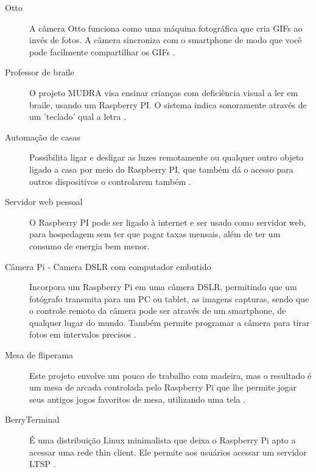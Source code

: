 \documentclass[
	12pt,				%
	openright,			%
	twoside,			%
	a4paper,			%
	chapter=TITLE,		%
	english,			%
	brazil				%
	]{abntex2}
\begin{document}
\begin{description}

\item[Otto]A câmera Otto funciona como uma máquina fotográfica que cria GIFs ao invés de fotos. A câmera sincroniza com o smartphone de modo que você pode facilmente compartilhar os GIFs \cite{otto}.
  
\item[Professor de braile] O projeto MUDRA visa ensinar crianças com deficiência visual a ler em braile, usando um Raspberry PI. O sistema indica sonoramente através de um ’teclado’ qual a  letra \cite{mudra}.

\item[Automação de casas] Possibilita ligar e desligar as luzes remotamente ou qualquer outro objeto ligado a casa por meio do Raspberry PI, que também dá o acesso para outros dispositivos o controlarem também \cite{AplicacaoRaspberry}.

\item[Servidor web pessoal] O Raspberry PI pode ser ligado à internet e ser usado como servidor web, para hospedagem sem ter que pagar taxas mensais, além de ter um consumo de energia bem menor.


\item[Câmera Pi - Camera  DSLR com computador embutido] Incorpora um Raspberry Pi em uma câmera DSLR, permitindo que um fotógrafo transmita para um PC ou tablet, as imagens capturas, sendo que o controle remoto da câmera pode ser através de um smartphone, de qualquer lugar do mundo. Também permite programar a câmera para tirar fotos em intervalos precisos \cite{cameraPI}.

\item[Mesa de fliperama] Este projeto envolve um pouco de trabalho com madeira, mas o resultado é um mesa de arcada controlada pelo Raspberry Pi que lhe permite jogar seus antigos jogos favoritos de mesa, utilizando uma tela \cite{AplicacaoRaspberry}.

\item[BerryTerminal] É uma distribuição Linux minimalista que deixa o Raspberry Pi apto a acessar uma rede thin client. Ele permite aos usuários acessar um servidor LTSP \cite{berryterminal}.

\end{description}


\end{document}
